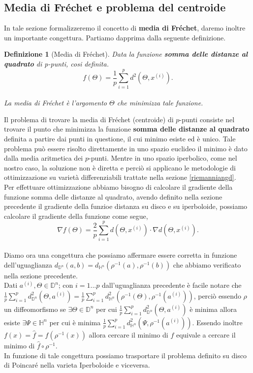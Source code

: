 \documentclass[a4paper, 12pt]{article}
\newtheorem{definition}{Definizione}
\begin{document}
\subsection{Media di Fréchet e problema del centroide}
In tale sezione formalizzeremo il concetto di \textbf{media di Fréchet}, daremo inoltre un importante congettura. Partiamo dapprima dalla seguente definizione.
\begin{definition}[Media di Fréchet]
Data la funzione \textbf{somma delle distanze al quadrato} di p-punti, cosi definita.\\
\[f(\Theta) = \frac{1}{p}\sum_{i=1}^p d^2(\Theta, x^{(i)}).\]\\
La media di Fréchet è l'argomento $\Theta$ che minimizza tale funzione.
\end{definition}
Il problema di trovare la media di Fréchet (centroide) di $p$-punti consiste nel trovare il punto che minimizza la funzione \textbf{somma delle distanze al quadrato} definita a partire dai punti in questione, il cui minimo esiste ed è unico. Tale problema può essere risolto direttamente in uno spazio euclideo il minimo è dato dalla media aritmetica dei $p$-punti. Mentre in uno spazio iperbolico, come nel nostro caso, la soluzione non è diretta e perciò si applicano le metodologie di ottimizzazione su varietà differenziabili trattate nella sezione \ref{riemanniangd}.\\
Per effettuare ottimizzazione abbiamo bisogno di calcolare il gradiente della funzione somma delle distanze al quadrato, avendo definito nella sezione precedente il gradiente della funzioe distanza su disco e su iperboloide, possiamo calcolare il gradiente della funzione come segue,\\
\[\nabla f(\Theta) = \frac{2}{p} \sum_{i=1}^p d(\Theta, x^{(i)}) \cdot \nabla d(\Theta, x^{(i)}).\]\\
Diamo ora una congettura che possiamo affermare essere corretta in funzione dell'uguaglianza $d_{\mathbb{D}^n}(a, b) = d_{\mathbb{H}^n}(\rho^{-1}(a), \rho^{-1}(b))$ che abbiamo verificato nella sezione precedente.\\
Dati $a^{(i)}, \Theta \in \mathbb{D}^n$; con $i = 1...p$ dall'uguaglianza precedente è facile notare che $\frac{1}{p}\sum_{i=1}^p d_{\mathbb{D}^n}^2(\Theta, a^{(i)}) = \frac{1}{p}\sum_{i=1}^p d_{\mathbb{H}^n}^2(\rho^{-1}(\Theta), \rho^{-1}(a^{(i)}))$, perciò essendo $\rho$ un diffeomorfismo se $\exists \Theta \in \mathbb{D}^n$ per cui $\frac{1}{p}\sum_{i=1}^p d_{\mathbb{D}^n}^2(\Theta, a^{(i)})$ è minima allora esiste $\exists \Psi \in \mathbb{H}^n$ per cui è minima $\frac{1}{p}\sum_{i=1}^p d_{\mathbb{H}^n}^2(\Psi, \rho^{-1}(a^{(i)}))$. Essendo inoltre $f(x) = \hat{f} = f(\rho^{-1}(x))$ allora cercare il minimo di $f$ equivale a cercare il minimo di $\hat{f} \circ \rho^{-1}$.\\
In funzione di tale congettura possiamo trasportare il problema definito su disco di Poincaré nella varieta Iperboloide e viceversa.
\end{document}
